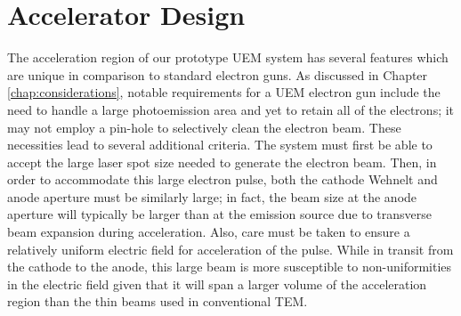 
\section{Accelerator Design} \label{sec:gun_design}

The acceleration region of our prototype UEM system has several features which are unique in comparison to standard electron guns.
As discussed in Chapter \ref{chap:considerations}, notable requirements for a UEM electron gun include the need to handle a large photoemission area and yet to retain all of the electrons; it may not employ a pin-hole to selectively clean the electron beam.
These necessities lead to several additional criteria.
The system must first be able to accept the large laser spot size needed to generate the electron beam.
Then, in order to accommodate this large electron pulse, both the cathode Wehnelt and anode aperture must be similarly large; in fact, the beam size at the anode aperture will typically be larger than at the emission source due to transverse beam expansion during acceleration.
Also, care must be taken to ensure a relatively uniform electric field for acceleration of the pulse.
While in transit from the cathode to the anode, this large beam is more susceptible to non-uniformities in the electric field given that it will span a larger volume of the acceleration region than the thin beams used in conventional TEM.

